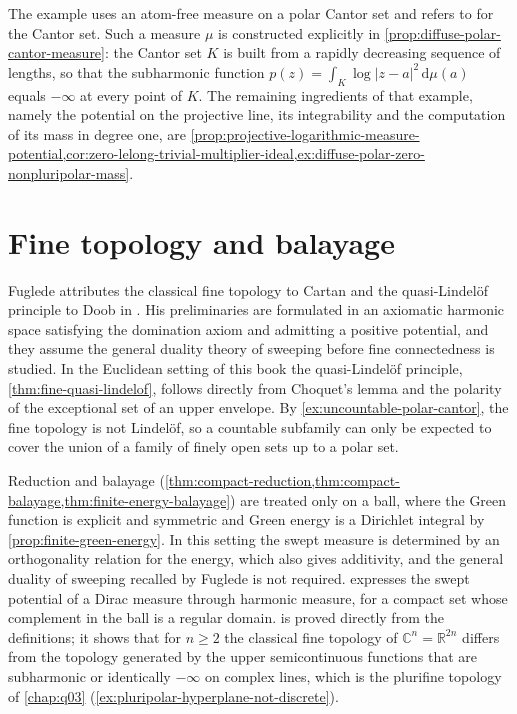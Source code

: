 The example \cite[Example~6.1.3]{XiaSampleBook} uses an atom-free measure on a polar Cantor set and refers to \cite[p.~31]{Car83} for the Cantor set. Such a measure $\mu$ is constructed explicitly in \cref{prop:diffuse-polar-cantor-measure}: the Cantor set $K$ is built from a rapidly decreasing sequence of lengths, so that the subharmonic function $p(z)=\int_K\log|z-a|^2\,\mathrm d\mu(a)$ equals $-\infty$ at every point of $K$. The remaining ingredients of that example, namely the potential on the projective line, its integrability and the computation of its mass in degree one, are \cref{prop:projective-logarithmic-measure-potential,cor:zero-lelong-trivial-multiplier-ideal,ex:diffuse-polar-zero-nonpluripolar-mass}.

\section{Fine topology and balayage}
\label{sec:history-fine}
Fuglede attributes the classical fine topology to Cartan and the quasi-Lindel\"of principle to Doob in \cite[Introduction]{Fug71Fine}. His preliminaries \cite[Section 1]{Fug71Fine} are formulated in an axiomatic harmonic space satisfying the domination axiom and admitting a positive potential, and they assume the general duality theory of sweeping before fine connectedness is studied. In the Euclidean setting of this book the quasi-Lindel\"of principle, \cref{thm:fine-quasi-lindelof}, follows directly from Choquet's lemma and the polarity of the exceptional set of an upper envelope. By \cref{ex:uncountable-polar-cantor}, the fine topology is not Lindel\"of, so a countable subfamily can only be expected to cover the union of a family of finely open sets up to a polar set.

Reduction and balayage (\cref{thm:compact-reduction,thm:compact-balayage,thm:finite-energy-balayage}) are treated only on a ball, where the Green function is explicit and symmetric and Green energy is a Dirichlet integral by \cref{prop:finite-green-energy}. In this setting the swept measure is determined by an orthogonality relation for the energy, which also gives additivity, and the general duality of sweeping recalled by Fuglede is not required.  expresses the swept potential of a Dirac measure through harmonic measure, for a compact set whose complement in the ball is a regular domain.  is proved directly from the definitions; it shows that for $n\geq2$ the classical fine topology of $\mathbb C^n=\mathbb R^{2n}$ differs from the topology generated by the upper semicontinuous functions that are subharmonic or identically $-\infty$ on complex lines, which is the plurifine topology of \cref{chap:q03} (\cref{ex:pluripolar-hyperplane-not-discrete}).

